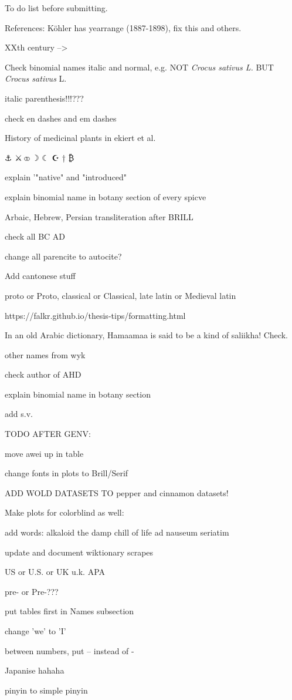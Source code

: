 To do list before submitting.

References: Köhler has yearrange (1887-1898), fix this and others.

XXth century --> \textss

Check binomial names italic and normal, e.g. NOT \textit{Crocus sativus L.} BUT \textit{Crocus sativus} L.

italic parenthesis!!!???

check en dashes and em dashes

History of medicinal plants in ekiert et al.

⚓ 
⚔
⚭
☽
☾
☪
†
₿

explain '"native" and "introduced"

explain binomial name in botany section of every spicve


Arbaic, Hebrew, Persian transliteration after BRILL

check all BC AD


change all parencite to autocite?

Add cantonese stuff

proto or Proto, classical or Classical, late latin or Medieval latin

https://falkr.github.io/thesis-tips/formatting.html

In an old Arabic dictionary, Hamaamaa is said to be a kind of saliikha! Check.

other names from wyk

check author of AHD

explain binomial name in botany section

add s.v.

TODO AFTER GENV:

move awei up in table

change fonts in plots to Brill/Serif

ADD WOLD DATASETS TO pepper and cinnamon datasets!

Make plots for colorblind as well:

add words:
alkaloid
the damp chill of life
ad nauseum
seriatim

update and document wiktionary scrapes

US or U.S. or UK u.k. APA

pre- or Pre-???


put tables first in Names subsection

change 'we' to 'I'

between numbers, put -- instead of -

Japanise hahaha

pinyin to simple pinyin